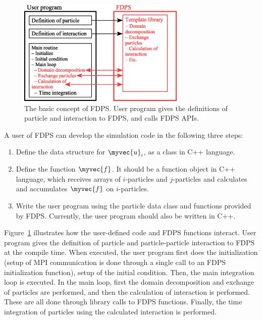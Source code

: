 \begin{figure}
  \begin{center}
    \includegraphics[width=8cm]{fig/concept.eps}
  \end{center}
  \caption{The basic concept of FDPS. User program gives the definitions of
    particle and interaction to FDPS, and calls FDPS APIs.}
  \label{fig:concept}
\end{figure}

A user of FDPS can develop the simulation code in the following three
steps:

\begin{enumerate}
\item Define the data structure for $\myvec{u}_i$, as a class in C++
  language.

\item Define the function $\myvec{f}$. It should be a 
  function object in C++ language, which receives
  arrays of $i$-particles and $j$-particles and calculates
  and accumulates $\myvec{f}$ on $i$-particles.

\item Write the user program using the particle data class and
  functions provided by FDPS. Currently, the user program should also
  be written in C++.
\end{enumerate}

Figure~\ref{fig:concept} illustrates how the user-defined code and
FDPS functions interact. User program gives the definition of particle
and particle-particle interaction to FDPS at the compile time. When
executed, the user program first does the initialization (setup of MPI
communication  is done through a single call to an FDPS initialization
function), setup of the initial condition. Then, the main integration
loop is executed. In the main loop, first the domain decomposition and
exchange of particles are performed, and then the calculation of
interaction is performed. These are all done through library calls to
FDPS functions. Finally, the time integration of particles using the
calculated interaction is performed.

